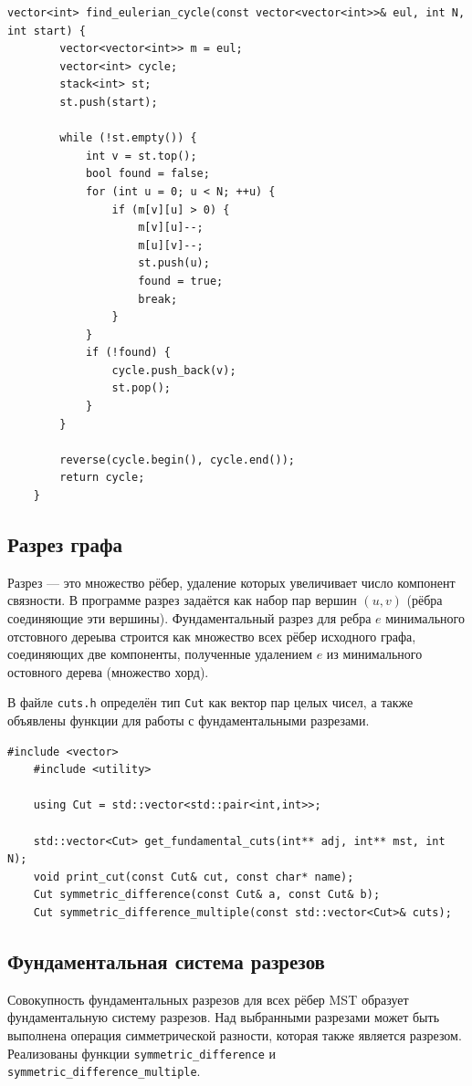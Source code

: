 \begin{lstlisting}[caption=Эйлеров цикл (euler.cpp)]
	vector<int> find_eulerian_cycle(const vector<vector<int>>& eul, int N, int start) {
		vector<vector<int>> m = eul;
		vector<int> cycle;
		stack<int> st;
		st.push(start);
		
		while (!st.empty()) {
			int v = st.top();
			bool found = false;
			for (int u = 0; u < N; ++u) {
				if (m[v][u] > 0) {
					m[v][u]--;
					m[u][v]--;
					st.push(u);
					found = true;
					break;
				}
			}
			if (!found) {
				cycle.push_back(v);
				st.pop();
			}
		}
		
		reverse(cycle.begin(), cycle.end());
		return cycle;
	}
\end{lstlisting}

\subsection{Разрез графа}
Разрез — это множество рёбер, удаление которых увеличивает число компонент связности. В программе разрез задаётся как набор пар вершин $(u,v)$ (рёбра соединяющие эти вершины). Фундаментальный разрез для ребра $e$ минимального отстовного дереыва строится как множество всех рёбер исходного графа, соединяющих две компоненты, полученные удалением $e$ из минимального остовного дерева (множество хорд).

В файле \texttt{cuts.h} определён тип \texttt{Cut} как вектор пар целых чисел, а также объявлены функции для работы с фундаментальными разрезами.

\begin{lstlisting}[caption=cuts.h]
	#include <vector>
	#include <utility>
	
	using Cut = std::vector<std::pair<int,int>>;
	
	std::vector<Cut> get_fundamental_cuts(int** adj, int** mst, int N);
	void print_cut(const Cut& cut, const char* name);
	Cut symmetric_difference(const Cut& a, const Cut& b);
	Cut symmetric_difference_multiple(const std::vector<Cut>& cuts);
\end{lstlisting}



\subsection{Фундаментальная система разрезов}
Совокупность фундаментальных разрезов для всех рёбер MST образует фундаментальную систему разрезов. Над выбранными разрезами может быть выполнена операция симметрической разности, которая также является разрезом. Реализованы функции \texttt{symmetric\_difference} и \texttt{symmetric\_difference\_multiple}.

